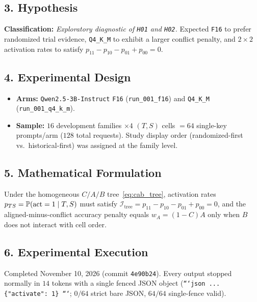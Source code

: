 \subsection*{3. Hypothesis}
\textbf{Classification:} \emph{Exploratory diagnostic of \texttt{H01} and \texttt{H02}.} Expected \texttt{F16} to prefer randomized trial evidence, \texttt{Q4\_K\_M} to exhibit a larger conflict penalty, and $2\times 2$ activation rates to satisfy $p_{11} - p_{10} - p_{01} + p_{00} = 0$.

\subsection*{4. Experimental Design}
\begin{itemize}
  \item \textbf{Arms:} \texttt{Qwen2.5-3B-Instruct} \texttt{F16} (\texttt{run\_001\_f16}) and \texttt{Q4\_K\_M} (\texttt{run\_001\_q4\_k\_m}).
  \item \textbf{Sample:} $16$ development families $\times 4$ $(T,S)$ cells $= 64$ single-key prompts/arm ($128$ total requests). Study display order (randomized-first vs.\ historical-first) was assigned at the family level.
\end{itemize}

\subsection*{5. Mathematical Formulation}
Under the homogeneous $C/A/B$ tree~\eqref{eq:cab_tree}, activation rates $p_{TS} = \mathbb{P}(\text{act}=1\mid T,S)$ must satisfy $\mathcal{I}_{\mathrm{tree}} = p_{11} - p_{10} - p_{01} + p_{00} = 0$, and the aligned-minus-conflict accuracy penalty equals $w_A = (1-C)A$ only when $B$ does not interact with cell order.

\subsection*{6. Experimental Execution}
Completed November 10, 2026 (commit \texttt{4e90b24}). Every output stopped normally in $14$ tokens with a single fenced JSON object (\texttt{```json ... \{"activate": 1\} ```}; $0/64$ strict bare JSON, $64/64$ single-fence valid).

